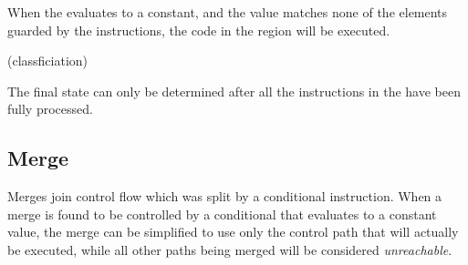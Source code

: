 \begin{observation}\label{obs:ccp-casesgl-guard}
  When the  evaluates to a constant, and the value
  matches none of the elements guarded by the 
  instructions, the code in the  region will be
  executed.
\end{observation}

\begin{algorithm}[h!]
  \label{algo:ccp-caseelse-classification}
  \caption{ (classficiation)}
  \begin{algorithmic}[1]
        \STATE{}
        \ENDIF
      \ENDFOR
    \ELSE
      \STATE{}
    \ENDIF
  \end{algorithmic}
\end{algorithm}

The final state  can only be determined after all
the  instructions in the  have been
fully processed.


\subsection{Merge}\label{const-prop:classification-of-merge}
Merges join control flow which was split by a conditional instruction.
When a merge is found to be controlled by a conditional that evaluates
to a constant value, the merge can be simplified to use only the
control path that will actually be executed, while all other paths
being merged will be considered \emph{unreachable}.


